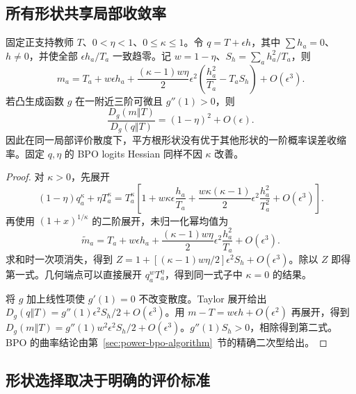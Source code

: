 \documentclass[lang=cn,scheme=chinese,openany]{../book/elegantbook}
\begin{document}
\subsection{所有形状共享局部收敛率}

\begin{theorem}[幂均值的局部展开与共同收缩因子]
\label{thm:power-common-local-rate}
固定正支持教师 $T$、$0<\eta<1$、$0\le\kappa\le1$。令 $q=T+\epsilon h$，其中 $\sum h_a=0$、$h\ne0$，并使全部 $\epsilon h_a/T_a$ 一致趋零。记 $w=1-\eta$、$S_h=\sum_ah_a^2/T_a$，则
\begin{equation}
 m_a=T_a+w\epsilon h_a
 +\frac{(\kappa-1)w\eta}{2}\epsilon^2
       \left(\frac{h_a^2}{T_a}-T_aS_h\right)+O(\epsilon^3).
 \label{eq:power-second-order-target}
\end{equation}
若凸生成函数 $g$ 在一附近三阶可微且 $g''(1)>0$，则
\begin{equation}
 \frac{D_g(m\Vert T)}{D_g(q\Vert T)}
 =(1-\eta)^2+O(\epsilon).
 \label{eq:power-local-divergence-rate}
\end{equation}
因此在同一局部评价散度下，平方根形状没有优于其他形状的一阶概率误差收缩率。固定 $q,\eta$ 的 BPO logits Hessian 同样不因 $\kappa$ 改善。
\end{theorem}

\begin{proof}
对 $\kappa>0$，先展开
\begin{equation}
 (1-\eta)q_a^\kappa+\eta T_a^\kappa
 =T_a^\kappa\left[1+w\kappa\epsilon\frac{h_a}{T_a}
 +\frac{w\kappa(\kappa-1)}2\epsilon^2\frac{h_a^2}{T_a^2}
 +O(\epsilon^3)\right].
\end{equation}
再使用 $(1+x)^{1/\kappa}$ 的二阶展开，未归一化幂均值为
\begin{equation}
 \widetilde m_a=T_a+w\epsilon h_a
 +\frac{(\kappa-1)w\eta}{2}\epsilon^2\frac{h_a^2}{T_a}+O(\epsilon^3).
\end{equation}
求和时一次项消失，得到 $Z=1+[(\kappa-1)w\eta/2]\epsilon^2S_h+O(\epsilon^3)$。除以 $Z$ 即得第一式。几何端点可以直接展开 $q_a^wT_a^\eta$，得到同一式子中 $\kappa=0$ 的结果。

将 $g$ 加上线性项使 $g'(1)=0$ 不改变散度。Taylor 展开给出 $D_g(q\Vert T)=g''(1)\epsilon^2S_h/2+O(\epsilon^3)$。用 $m-T=w\epsilon h+O(\epsilon^2)$ 再展开，得到 $D_g(m\Vert T)=g''(1)w^2\epsilon^2S_h/2+O(\epsilon^3)$。$g''(1)S_h>0$，相除得到第二式。BPO 的曲率结论由第~\ref{sec:power-bpo-algorithm}~节的精确二次型给出。
\end{proof}

\subsection{形状选择取决于明确的评价标准}
\end{document}
